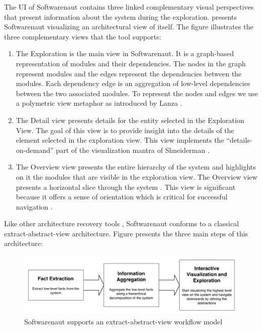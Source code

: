 \documentclass[preprint,12pt]{elsarticle}
\begin{document}
The UI of Softwarenaut contains three linked complementary visual perspectives that present information about the system during the exploration.  presents Softwarenaut visualizing an architectural view of itself. The figure illustrates the three complementary views that the tool supports:

\begin{enumerate}
\item The Exploration is the main view in Softwarenaut. It is a graph-based representation of modules and their dependencies. The nodes in the graph represent modules and the edges represent the dependencies between the modules. Each dependency edge is an aggregation of low-level dependencies between the two associated modules. To represent the nodes and edges we use a polymetric view metaphor as introduced by Lanza \cite{lanza-pv, lanza-oomp}. 

\item The Detail view presents details for the entity selected in the Exploration View. The goal of this view is to provide insight into the details of the element selected in the exploration view. This view implements the ``details-on-demand'' part of the visualization mantra of Shneiderman \cite{shneid-eyes}.

\item The Overview view presents the entire hierarchy of the system and highlights on it the modules that are visible in the exploration view. The Overview view presents a horizontal slice through the system \cite{wong-thesis}. %
This view is significant because it offers a sense of orientation which is critical for successful navigation \cite{storey-awareness}.

\end{enumerate}


Like other architecture recovery tools \cite{pollet-sar}, Softwarenaut conforms to a classical extract-abstract-view architecture. Figure  presents the three main steps of this architecture:

\begin{figure}[h]
\begin{center}
\includegraphics[width=\linewidth]{images/SnautFlow}
\caption{Softwarenaut supports an extract-abstract-view workflow model}
\end{center}
\end{figure}
\end{document}
